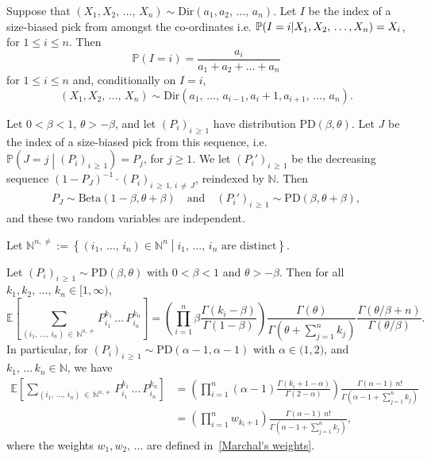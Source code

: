 \documentclass[AHL,Unicode,longabstracts,published]{cedram}
\newcommand{\Ec}[1]{\mathbb{E} \left[#1\right]}
\newcommand{\enstq}[2]{\left\lbrace#1\mathrel{}\middle|\mathrel{}#2\right\rbrace}
\newcommand{\Ppsq}[2]{\mathbb{P} \left(#1\mathrel{}\middle|\mathrel{}#2\right)}
\newcommand{\intervalle}[4]{\mathopen{#1}#2
\mathclose{}\mathpunct{},#3
\mathclose{#4}}
\newcommand{\intervallefo}[2]{\intervalle{[}{#1}{#2}{)}}
\newcommand{\intervalleoo}[2]{\intervalle{(}{#1}{#2}{)}}
\newcommand{\Prob}[1]{\ensuremath{\mathbb{P} \left(#1 \right)}}
\newcommand{\Betal}{\mathrm{Beta}}
\newcommand{\PD}{\mathrm{PD}}
\newcommand{\Dir}{\mathrm{Dir}}
\newcommand{\N}{\mathbb{N}}
\newcommand{\bbP}{\mathbb{P}}
\begin{document}

\begin{lemm}\label{lem:biasDir}
Suppose that $(X_1, X_2,\,\ldots,\,X_n) \sim \Dir(a_1, a_2,\,\ldots,\,a_n)$. Let $I$ be the index of a size-biased pick from amongst the co-ordinates i.e. $\bbP(I=i|X_1, X_2,\,\ldots,\linebreak X_n)  = X_i$, for $1 \le i \le n$. Then
\[
\Prob{I = i} = \frac{a_i}{a_1 + a_2 + \ldots + a_n}
\]
for $1 \le i \le n$ and, conditionally on $I=i$,
\[
\left(X_1, X_2,\,\ldots,\,X_n\right) \sim \Dir\left(a_1,\,\ldots,\,a_{i-1}, a_i + 1, a_{i+1}, \,\ldots,\,a_n\right).
\]
\end{lemm}


\begin{lemm}\label{lem:PD factorisation}
Let $0<\beta<1$, $\theta>-\beta$, and let $(P_i)_{i\,\geq\,1}$ have distribution $\PD(\beta,\theta)$. Let $J$ be the index of a size-biased pick from this sequence, i.e. $\Ppsq{J=j}{(P_i)_{i\,\geq\,1}}=P_j$, for $j\geq 1$. We let $(P_i')_{i\,\geq\,1}$ be the decreasing sequence $(1-P_J)^{-1}\cdot (P_i)_{i\,\ge\, 1,\,i\,\neq\,J}$, reindexed by $\N$. Then
\begin{align*}
P_J\sim \Betal(1-\beta,\theta+\beta) \quad \text{and} \quad \left(P_i'\right)_{i\,\geq\,1} \sim \PD(\beta,\theta+\beta),
\end{align*}
and these two random variables are independent.
\end{lemm}


Let $\N^{n,\neq}:=\enstq{(i_1,\,\dots,\,i_n)\in \N^n }{i_1,\,\dots,\,i_n \text{ are distinct}}$.
\begin{lemm}\label{lem:pd}
Let $(P_i)_{i\,\geq\,1} \sim \PD(\beta,\theta)$ with $0<\beta<1$ and $\theta>-\beta$. Then for all $k_1, k_2,\,\dots,\, k_n \in \intervallefo{1}{\infty}$,
\begin{equation}\label{eq:momentsPD}
\Ec{\sum_{\left(i_1,\,\dots,\,i_n\right)\,\in\,\N^{n,\neq}}P_{i_1}^{k_1}\,\dots\,P_{i_n}^{k_n}}= \left(\prod_{i=1}^n \beta \frac{\Gamma(k_i-\beta)}{\Gamma(1-\beta)}\right)\frac{\Gamma(\theta)}{\Gamma\left(\theta+\sum\limits_{j=1}^n k_j\right)} \frac{\Gamma(\theta/\beta+n)}{\Gamma(\theta/\beta)}.
\end{equation}
In particular, for $(P_i)_{i\,\geq\,1} \sim \PD(\alpha-1,\alpha -1)$ with $\alpha\in\intervalleoo{1}{2}$, and $k_1,\,\dots\,k_n \in \N$, we have
\begin{align*}
\Ec{\sum_{\left(i_1,\,\dots,\,i_n\right)\,\in\,\N^{n,\neq}}P_{i_1}^{k_1}\,\dots\,P_{i_n}^{k_n}}&= \left(\prod_{i=1}^n (\alpha-1) \frac{\Gamma\left(k_i+1-\alpha\right)}{\Gamma(2-\alpha)}\right)\frac{\Gamma(\alpha-1) \ n!}{\Gamma\left(\alpha-1+\sum\limits_{j=1}^n k_j\right)} \\
&= \left(\prod_{i=1}^n w_{k_i+1}\right) \frac{\Gamma(\alpha-1) \ n!}{\Gamma\left(\alpha-1+\sum\limits_{j=1}^n k_j\right)},
\end{align*}
where the weights $w_1,w_2,\,\dots$ are defined in~\eqref{Marchal's weights}.
\end{lemm}
\end{document}
